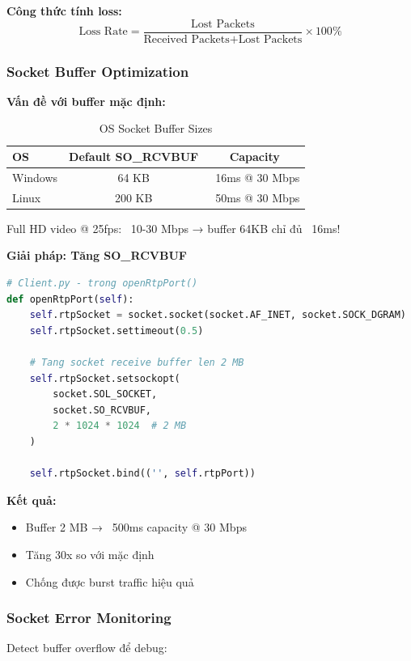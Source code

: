 \textbf{Công thức tính loss:}
\begin{equation}
\text{Loss Rate} = \frac{\text{Lost Packets}}{\text{Received Packets} + \text{Lost Packets}} \times 100\%
\end{equation}

\subsubsection{Socket Buffer Optimization}

\textbf{Vấn đề với buffer mặc định:}
\begin{table}[H]
\centering
\begin{tabular}{|l|c|c|}
\hline
\textbf{OS} & \textbf{Default SO\_RCVBUF} & \textbf{Capacity} \\
\hline
Windows & 64 KB & ~16ms @ 30 Mbps \\
Linux & 200 KB & ~50ms @ 30 Mbps \\
\hline
\end{tabular}
\caption{OS Socket Buffer Sizes}
\end{table}

Full HD video @ 25fps: ~10-30 Mbps → buffer 64KB chỉ đủ ~16ms!

\textbf{Giải pháp: Tăng SO\_RCVBUF}
\begin{lstlisting}[language=Python]
# Client.py - trong openRtpPort()
def openRtpPort(self):
    self.rtpSocket = socket.socket(socket.AF_INET, socket.SOCK_DGRAM)
    self.rtpSocket.settimeout(0.5)
    
    # Tang socket receive buffer len 2 MB
    self.rtpSocket.setsockopt(
        socket.SOL_SOCKET,
        socket.SO_RCVBUF,
        2 * 1024 * 1024  # 2 MB
    )
    
    self.rtpSocket.bind(('', self.rtpPort))
\end{lstlisting}

\textbf{Kết quả:}
\begin{itemize}
    \item Buffer 2 MB → ~500ms capacity @ 30 Mbps
    \item Tăng 30x so với mặc định
    \item Chống được burst traffic hiệu quả
\end{itemize}

\subsubsection{Socket Error Monitoring}

Detect buffer overflow để debug:

